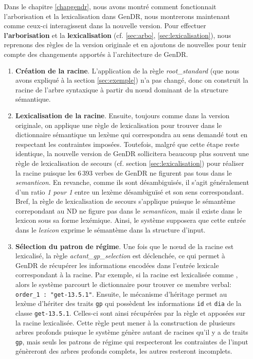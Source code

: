 Dans le chapitre \ref{chapgendr}, nous avons montré comment fonctionnait l'arborisation et la lexicalisation dans GenDR, nous montrerons maintenant comme ceux-ci interagissent dans la nouvelle version. Pour effectuer \textbf{l'arborisation} et la \textbf{lexicalisation} (cf. \ref{sec:arbo}, \ref{sec:lexicalisation}), nous reprenons des règles de la version originale et en ajoutons de nouvelles pour tenir compte des changements apportés à l'architecture de GenDR. 

\begin{enumerate}
  \item \textbf{Création de la racine}.
  L'application de la règle \emph{root\_standard} (que nous avons expliqué à la section \ref{sec:exemple}) n'a pas changé, donc on construit la racine de l'arbre syntaxique à partir du n\oe{}ud dominant de la structure sémantique.

  \item \textbf{Lexicalisation de la racine}.
  Ensuite, toujours comme dans la version originale, on applique une règle de lexicalisation pour trouver dans le dictionnaire sémantique un lexème qui correspondra au sens demandé tout en respectant les contraintes imposées. Toutefois, malgré que cette étape reste identique, la nouvelle version de GenDR sollicitera beaucoup plus souvent une règle de lexicalisation de secours (cf. section \ref{sec:lexicalisation}) pour réaliser la racine puisque les 6\,393 verbes de GenDR ne figurent pas tous dans le \emph{semanticon}. En revanche, comme ils sont désambiguïsés, il s'agit généralement d'un ratio \emph{1 pour 1} entre un lexème désambiguïsé et son sens correspondant. Bref, la règle de lexicalisation de secours s'applique puisque le sémantème correpondant au \ac{ND} ne figure pas dans le \emph{semanticon}, mais il existe dans le lexicon sous sa forme lexémique. Ainsi, le système supposera que cette entrée dans le \emph{lexicon} exprime le sémantème dans la structure d'input.

  \item \textbf{Sélection du patron de régime}.
  Une fois que le n\oe{}ud de la racine est lexicalisé, la règle \emph{actant\_gp\_selection} est déclenchée, ce qui permet à GenDR de récupérer les informations encodées dans l'entrée lexicale correspondant à la racine. Par exemple, si la racine est lexicalisée comme , alors le système parcourt le dictionnaire pour trouver ce membre verbal: \lstinline|order_1 : "get-13.5.1"|. Ensuite, le mécanisme d'héritage permet au lexème  d'hériter des traits \texttt{gp} qui possèdent les informations \texttt{id} et \texttt{dia} de la classe \texttt{get-13.5.1}. Celles-ci sont ainsi récupérées par la règle et apposées sur la racine lexicalisée. Cette règle peut mener à la construction de plusieurs arbres profonds puisque le système génère autant de racines qu'il y a de traits \texttt{gp}, mais seuls les patrons de régime qui respecteront les contraintes de l'input génèreront des arbres profonds complets, les autres resteront incomplets.
	

\end{enumerate}
